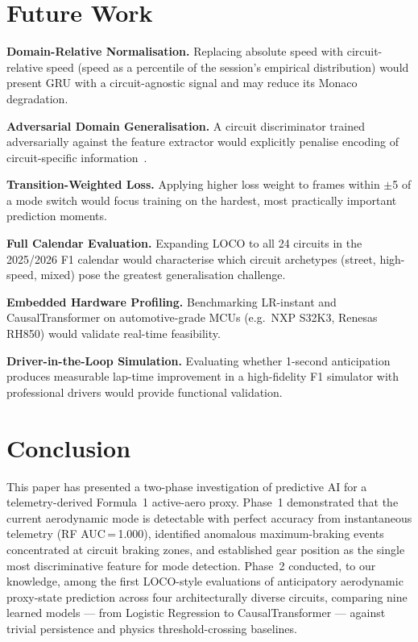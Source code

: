 \documentclass[conference,a4paper]{IEEEtran}
\begin{document}
\section{Future Work}

\textbf{Domain-Relative Normalisation.}
Replacing absolute speed with circuit-relative speed (speed as a percentile of the
session's empirical distribution) would present GRU with a circuit-agnostic signal
and may reduce its Monaco degradation.

\textbf{Adversarial Domain Generalisation.}
A circuit discriminator trained adversarially against the feature extractor would
explicitly penalise encoding of circuit-specific information~\cite{ref_dann}.

\textbf{Transition-Weighted Loss.}
Applying higher loss weight to frames within $\pm$5 of a mode switch would focus
training on the hardest, most practically important prediction moments.

\textbf{Full Calendar Evaluation.}
Expanding LOCO to all 24 circuits in the 2025/2026 F1 calendar would characterise
which circuit archetypes (street, high-speed, mixed) pose the greatest generalisation
challenge.

\textbf{Embedded Hardware Profiling.}
Benchmarking LR-instant and CausalTransformer on automotive-grade MCUs
(e.g.\ NXP S32K3, Renesas RH850) would validate real-time feasibility.

\textbf{Driver-in-the-Loop Simulation.}
Evaluating whether 1-second anticipation produces measurable lap-time improvement in
a high-fidelity F1 simulator with professional drivers would provide functional
validation.

\section{Conclusion}

This paper has presented a two-phase investigation of predictive AI for a
telemetry-derived Formula~1 active-aero proxy.
Phase~1 demonstrated that the current aerodynamic mode is detectable with perfect
accuracy from instantaneous telemetry (RF AUC\,=\,1.000), identified anomalous
maximum-braking events concentrated at circuit braking zones, and established gear
position as the single most discriminative feature for mode detection.
Phase~2 conducted, to our knowledge, among the first LOCO-style evaluations of anticipatory
aerodynamic proxy-state prediction across four architecturally diverse circuits, comparing
nine learned models — from Logistic Regression to CausalTransformer — against trivial
persistence and physics threshold-crossing baselines.
\end{document}
